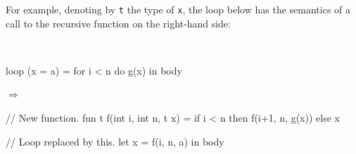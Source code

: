 \documentclass{sigplanconf}  %
\begin{document}
For example, denoting by {\tt t} the type of {\tt x}, the loop below
has the semantics of a call to the recursive function on the
right-hand side:

\hfill\\
\begin{minipage}{0.35\columnwidth}
\begin{colorcode}
loop (x = a) =
  for i < n do g(x)
in body
\end{colorcode}
\end{minipage}
\begin{minipage}{0.05\columnwidth}
$\Rightarrow$
\end{minipage}
\begin{minipage}{0.6\columnwidth}
\begin{colorcode}
// New function.
fun t f(int i, int n, t x) =
  if i < n
    then f(i+1, n, g(x))
    else x

// Loop replaced by this.
let x = f(i, n, a)
in body
\end{colorcode}
\end{minipage}
\end{document}
